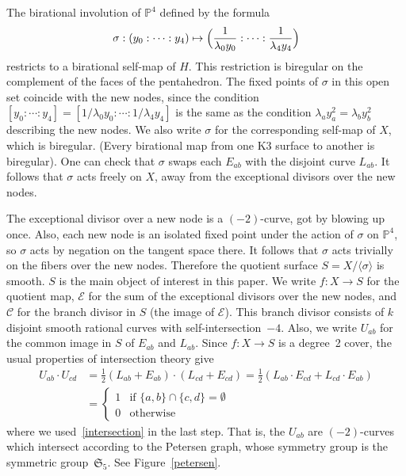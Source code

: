 \documentclass[11pt]{article}
\theoremstyle{definition}
\numberwithin{equation}{section}
\numberwithin{figure}{section}
\numberwithin{table}{section}
\newcommand{\bbP}{{\mathbb{P}}}
\newcommand{\calC}{\mathcal{C}}
\newcommand{\calE}{\mathcal{E}}
\newcommand{\frakS}{\mathfrak{S}}
\begin{document}
The birational involution of $\bbP^4$ defined by the formula
\[
\sigma:(y_0:\cdots:y_4)\mapsto \Bigl(\frac{1}{\lambda_0y_0}:\cdots:\frac{1}{\lambda_4y_4}\Bigr)
\]
restricts to a birational self-map of $H$. This restriction is biregular on the complement of the faces of the pentahedron. The fixed points of $\sigma$ in this open set coincide with the new nodes, since the condition $[y_0:\cdots:y_4]=[1/\lambda_0y_0:\cdots:1/\lambda_4y_4]$ is the same as the condition $\lambda_ay_a^2=\lambda_by_b^2$ describing the new nodes. We also write $\sigma$ for the corresponding self-map of $X$, which is biregular. (Every birational map from one K3 surface to another is biregular). One can check that $\sigma$ swaps each $E_{ab}$ with the disjoint curve $L_{ab}$. It follows that $\sigma$ acts freely on $X$, away from the exceptional divisors over the new nodes.

The exceptional divisor over a new node is a $(-2)$-curve, got by blowing up once. Also, each new node is an isolated fixed point under the action of $\sigma$ on $\bbP^4$, so $\sigma$ acts by negation on the tangent space there. It follows that $\sigma$ acts trivially on the fibers over the new nodes. Therefore the quotient surface $S=X/\langle\sigma\rangle$ is smooth. $S$ is the main object of interest in this paper. We write $f:X\to S$ for the quotient map, $\calE$ for the sum of the exceptional divisors over the new nodes, and $\calC$ for the branch divisor in $S$ (the image of $\calE$). This branch divisor consists of $k$ disjoint smooth rational curves with self-intersection~$-4$. Also, we write $U_{ab}$ for the common image in $S$ of $E_{ab}$ and $L_{ab}$. Since $f:X\to S$ is a degree~2 cover, the usual properties of intersection theory give
\begin{align*}
U_{ab}\cdot U_{cd} &{}= \frac{1}{2}(L_{ab}+E_{ab})\cdot (L_{cd}+E_{cd}) =\frac{1}{2} (L_{ab}\cdot E_{cd}+L_{cd}\cdot E_{ab})
\\
&{}=
\begin{cases}
1&\text{if }\{a,b\}\cap\{c,d\}=\emptyset\\
0&\text{otherwise}
\end{cases}
\end{align*}
where we used~\eqref{intersection} in the last step. That is, the $U_{ab}$ are $(-2)$-curves which intersect according to the Petersen graph, whose symmetry group is the symmetric group~$\frakS_5$. See Figure~\ref{petersen}.
\end{document}
